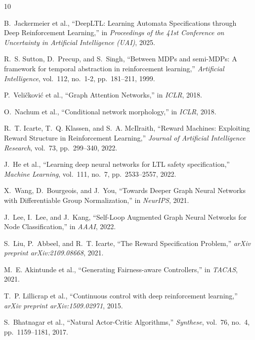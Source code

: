 \documentclass[conference]{IEEEtran}
\begin{document}

\begin{thebibliography}{10}

B.~Jackermeier et al., ``DeepLTL: Learning Automata Specifications through Deep Reinforcement Learning,'' in \emph{Proceedings of the 41st Conference on Uncertainty in Artificial Intelligence (UAI)}, 2025.

R.~S. Sutton, D.~Precup, and S.~Singh, ``Between MDPs and semi-MDPs: A framework for temporal abstraction in reinforcement learning,'' \emph{Artificial Intelligence}, vol.~112, no.~1-2, pp.~181--211, 1999.

P.~Veličković et al., ``Graph Attention Networks,'' in \emph{ICLR}, 2018.

O.~Nachum et al., ``Conditional network morphology,'' in \emph{ICLR}, 2018.

R.~T. Icarte, T.~Q. Klassen, and S.~A. McIlraith, ``Reward Machines: Exploiting Reward Structure in Reinforcement Learning,'' \emph{Journal of Artificial Intelligence Research}, vol.~73, pp.~299--340, 2022.

J.~He et al., ``Learning deep neural networks for LTL safety specification,'' \emph{Machine Learning}, vol.~111, no.~7, pp.~2533--2557, 2022.

X.~Wang, D.~Bourgeois, and J.~You, ``Towards Deeper Graph Neural Networks with Differentiable Group Normalization,'' in \emph{NeurIPS}, 2021.

J.~Lee, I.~Lee, and J.~Kang, ``Self-Loop Augmented Graph Neural Networks for Node Classification,'' in \emph{AAAI}, 2022.

S.~Liu, P.~Abbeel, and R.~T. Icarte, ``The Reward Specification Problem,'' \emph{arXiv preprint arXiv:2109.08668}, 2021.

M.~E. Akintunde et al., ``Generating Fairness-aware Controllers,'' in \emph{TACAS}, 2021.

T.~P. Lillicrap et al., ``Continuous control with deep reinforcement learning,'' \emph{arXiv preprint arXiv:1509.02971}, 2015.

S.~Bhatnagar et al., ``Natural Actor-Critic Algorithms,'' \emph{Synthese}, vol.~76, no.~4, pp.~1159--1181, 2017.

\end{thebibliography}
\end{document}

